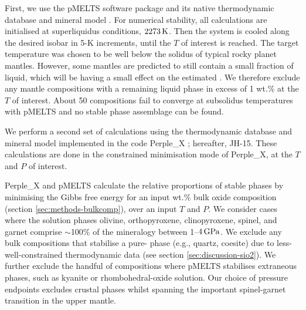 First, we use the pMELTS software package and its native thermodynamic database and mineral model \citep{asimow_algorithmic_1998, ghiorso_pmelts_2002}. For numerical stability, all calculations are initialised at superliquidus conditions, $2273\,{\rm K}$. Then the system is cooled along the desired isobar in 5-K increments, until the $T$ of interest is reached. The target temperature was chosen to be well below the solidus of typical rocky planet mantles. However, some mantles are predicted to still contain a small fraction of liquid, which will be having a small effect on the estimated \fo.  We therefore exclude any mantle compositions with a remaining liquid phase in excess of 1 wt.\% at the $T$ of interest. About 50 compositions fail to converge at subsolidus temperatures with pMELTS and no stable phase assemblage can be found. 

We perform a second set of calculations using the \citet{jennings_simple_2015} thermodynamic database and mineral model implemented in the code Perple\_X \citep{connolly_geodynamic_2009}; hereafter, JH-15. These calculations are done in the constrained minimisation mode of Perple\_X, at the $T$ and $P$ of interest.


Perple\_X and pMELTS calculate the relative proportions of stable phases by minimising the Gibbs free energy for an input wt.\% bulk oxide composition (section \ref{sec:methods-bulkcomp}), over an input $T$ and $P$. We consider cases where the solution phases olivine, orthopyroxene, clinopyroxene, spinel, and garnet comprise $\sim$100\% of the mineralogy between 1--$4\,{\rm GPa}$. We exclude any bulk compositions that stabilise a pure- phase (e.g., quartz, coesite) due to less-well-constrained thermodynamic data (see section \ref{sec:discussion-sio2}). We further exclude the handful of compositions where pMELTS stabilises extraneous phases, such as kyanite or rhombohedral-oxide solution. Our choice of pressure endpoints excludes crustal phases whilst spanning the important spinel-garnet transition in the upper mantle. 

